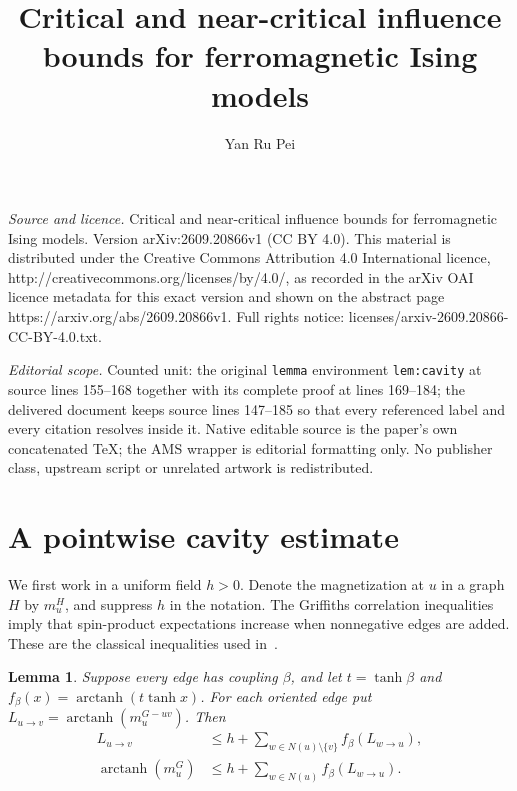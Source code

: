 \documentclass[10pt,a4paper]{amsart}
\newtheorem{lemma}[theorem]{Lemma}
\newcommand{\arctanh}{\operatorname{arctanh}}
\begin{document}
\title[Critical and near-critical influence bounds for ferromagneti]{Critical and near-critical influence bounds for ferromagnetic Ising models}
\author{Yan Ru Pei}
\date{}
\maketitle
\noindent\emph{Source and licence.} Critical and near-critical influence bounds for ferromagnetic Ising models. Version arXiv:2609.20866v1 (CC BY 4.0). This material is distributed under the Creative Commons Attribution 4.0 International licence, http://creativecommons.org/licenses/by/4.0/, as recorded in the arXiv OAI licence metadata for this exact version and shown on the abstract page https://arxiv.org/abs/2609.20866v1. Full rights notice: licenses/arxiv-2609.20866-CC-BY-4.0.txt.\par\smallskip
\noindent\textit{Editorial scope.} Counted unit: the original \texttt{lemma} environment \texttt{lem:cavity} at source lines 155--168 together with its complete proof at lines 169--184; the delivered document keeps source lines 147--185 so that every referenced label and every citation resolves inside it. Native editable source is the paper's own concatenated TeX; the AMS wrapper is editorial formatting only. No publisher class, upstream script or unrelated artwork is redistributed.
\section{A pointwise cavity estimate}

We first work in a uniform field $h>0$. Denote the magnetization at $u$
in a graph $H$ by $m_u^H$, and suppress $h$ in the notation.
The Griffiths correlation inequalities imply that spin-product
expectations increase when nonnegative edges are added.
These are the classical inequalities used in~\cite[Section~4]{CDKP}.


\begin{lemma}\label{lem:cavity}
Suppose every edge has coupling $\beta$, and let
$t=\tanh\beta$ and $f_\beta(x)=\arctanh(t\tanh x)$.
For each oriented edge put
$L_{u\to v}=\arctanh(m_u^{G-uv})$. Then
\begin{align}
 L_{u\to v}
    &\le h+\sum_{w\in N(u)\setminus\{v\}}f_\beta(L_{w\to u}),
       \label{eq:cavity}\\
 \arctanh(m_u^G)
    &\le h+\sum_{w\in N(u)}f_\beta(L_{w\to u}).
       \label{eq:root}
\end{align}
\end{lemma}
\end{document}

